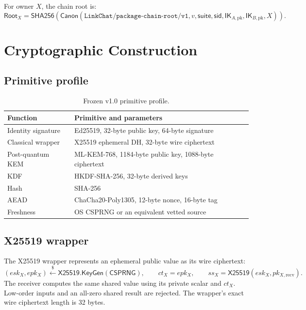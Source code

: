 \documentclass[11pt,letterpaper]{article}
\newcommand{\sample}{\xleftarrow{\$}}
\begin{document}
For owner $X$, the chain root is:
\[
  \mathsf{Root}_X = \mathsf{SHA256}(\mathsf{Canon}(
  \texttt{LinkChat/package-chain-root/v1},v,\mathsf{suite},\mathsf{sid},
  \mathsf{IK}_{A,\mathrm{pk}},\mathsf{IK}_{B,\mathrm{pk}},X)).
\]

\section{Cryptographic Construction}
\label{sec:crypto}

\subsection{Primitive profile}

\begin{table}[ht]
\centering
\caption{Frozen v1.0 primitive profile.}
\label{tab:primitives}
\begin{tabularx}{\textwidth}{P{0.28\textwidth}Y}
\toprule
Function & Primitive and parameters \\
\midrule
Identity signature & Ed25519, 32-byte public key, 64-byte signature \\
Classical wrapper & X25519 ephemeral DH, 32-byte wire ciphertext \\
Post-quantum KEM & ML-KEM-768, 1184-byte public key, 1088-byte ciphertext \\
KDF & HKDF-SHA-256, 32-byte derived keys \\
Hash & SHA-256 \\
AEAD & ChaCha20-Poly1305, 12-byte nonce, 16-byte tag \\
Freshness & OS CSPRNG or an equivalent vetted source \\
\bottomrule
\end{tabularx}
\end{table}

\subsection{X25519 wrapper}

The X25519 wrapper represents an ephemeral public value as its wire ciphertext:
\[
  (esk_X,epk_X) \sample \mathsf{X25519.KeyGen}(\mathsf{CSPRNG}),\qquad
  ct_X=epk_X,\qquad
  ss_X=\mathsf{X25519}(esk_X,pk_{X,\mathrm{recv}}).
\]
The receiver computes the same shared value using its private scalar and $ct_X$. Low-order
inputs and an all-zero shared result are rejected. The wrapper's exact wire ciphertext
length is 32 bytes.
\end{document}
